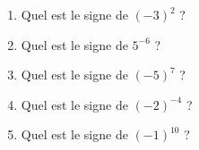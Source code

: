 
\begin{exercice}\label{exo2smath-0205}

    \begin{enumerate}
        \item
            Quel est le signe de \( (-3)^2\) ?
        \item
            Quel est le signe de \( 5^{-6}\) ?
        \item
            Quel est le signe de \( (-5)^7\) ?
        \item
            Quel est le signe de \( (-2)^{-4}\) ?
        \item
            Quel est le signe de \( (-1)^{10}\) ?
    \end{enumerate}

\end{exercice}
